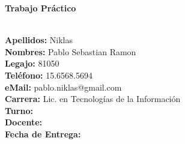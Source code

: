 \documentclass[a4paper,10pt,oneside]{article}
\title{\titulo}
\author{Autor: \autor\\Docente: \docente}
\date{} %
\begin{document}
\huge
\begin{center}
\textbf{Trabajo Pr\'actico}\\
\textbf{\materia}\\
\end{center}
\bigskip
\bigskip

\Large
\textbf{Apellidos:} Niklas \\
\textbf{Nombres:} Pablo Sebastian Ramon\\
\textbf{Legajo:} 81050\\
\textbf{Tel\'efono:} 15.6568.5694\\
\textbf{eMail:} pablo.niklas@gmail.com\\
\textbf{Carrera:} Lic. en Tecnolog\'ias de la Informaci\'on\\


\bigskip
\textbf{Turno:} \turno\\
\textbf{Docente:} \docente\\

\bigskip
\textbf{Fecha de Entrega:} \entrega
\normalsize
\end{document}
